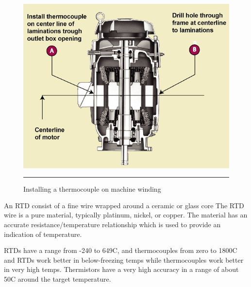 \begin{figure}[htbp]
	\centering
		\includegraphics[width = 4.5in]{./Figures/MS/fig331.png}
		\rule{35em}{0.5pt}
	\caption{Installing a thermocouple on machine winding}
	\label{fig:Installing a thermocouple on machine winding} 
\end{figure}
An RTD consist of a fine wire wrapped around a ceramic or glass core The RTD wire is a pure material, typically platinum, nickel, or copper. The material has an accurate resistance/temperature relationship which is used to provide an indication of temperature.

RTDs have a range from -240 to 649\textdegree C, and thermocouples from zero to 1800\textdegree C and RTDs work better in below-freezing temps while thermocouples work better in very high temps. Thermistors have a very high accuracy in a range of about 50\textdegree C around the target temperature. 

